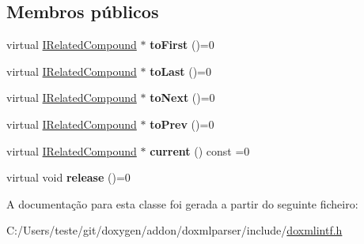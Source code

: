 \subsection*{Membros públicos}
\begin{DoxyCompactItemize}
\item 
\hypertarget{class_i_related_compound_iterator_adeeef739b0f2910daded6d917c927629}{virtual \hyperlink{class_i_related_compound}{I\-Related\-Compound} $\ast$ {\bfseries to\-First} ()=0}\label{class_i_related_compound_iterator_adeeef739b0f2910daded6d917c927629}

\item 
\hypertarget{class_i_related_compound_iterator_a1a78039baea88369c5761d84f88a562b}{virtual \hyperlink{class_i_related_compound}{I\-Related\-Compound} $\ast$ {\bfseries to\-Last} ()=0}\label{class_i_related_compound_iterator_a1a78039baea88369c5761d84f88a562b}

\item 
\hypertarget{class_i_related_compound_iterator_a71c17163af9899b4cbc7b4bc0bb549fe}{virtual \hyperlink{class_i_related_compound}{I\-Related\-Compound} $\ast$ {\bfseries to\-Next} ()=0}\label{class_i_related_compound_iterator_a71c17163af9899b4cbc7b4bc0bb549fe}

\item 
\hypertarget{class_i_related_compound_iterator_a560bf77abb2867f1eca387fd67de4a97}{virtual \hyperlink{class_i_related_compound}{I\-Related\-Compound} $\ast$ {\bfseries to\-Prev} ()=0}\label{class_i_related_compound_iterator_a560bf77abb2867f1eca387fd67de4a97}

\item 
\hypertarget{class_i_related_compound_iterator_ab90384b93f3a427408b112446dede9c8}{virtual \hyperlink{class_i_related_compound}{I\-Related\-Compound} $\ast$ {\bfseries current} () const =0}\label{class_i_related_compound_iterator_ab90384b93f3a427408b112446dede9c8}

\item 
\hypertarget{class_i_related_compound_iterator_aab0a52fdd148a54108e7bf49287d7c47}{virtual void {\bfseries release} ()=0}\label{class_i_related_compound_iterator_aab0a52fdd148a54108e7bf49287d7c47}

\end{DoxyCompactItemize}


A documentação para esta classe foi gerada a partir do seguinte ficheiro\-:\begin{DoxyCompactItemize}
\item 
C\-:/\-Users/teste/git/doxygen/addon/doxmlparser/include/\hyperlink{include_2doxmlintf_8h}{doxmlintf.\-h}\end{DoxyCompactItemize}
